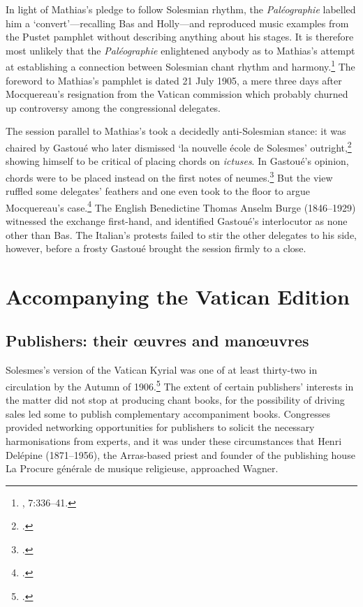 In light of Mathias's pledge to follow Solesmian rhythm, the \emph{Paléographie} labelled him a `convert'---recalling Bas and Holly---and reproduced music examples from the Pustet pamphlet without describing anything about his stages.
It is therefore most unlikely that the \emph{Paléographie} enlightened anybody as to Mathias's attempt at establishing a connection between Solesmian chant rhythm and harmony.\footnote{\cite{MocquereauPaleographiemusicale1901}, 7:336--41.}
The foreword to Mathias's pamphlet is dated 21 July 1905, a mere three days after Mocquereau's resignation from the Vatican commission which probably churned up controversy among the congressional delegates.

The session parallel to Mathias's took a decidedly anti-Solesmian stance: it was chaired by Gastoué who later dismissed `la nouvelle école de Solesmes' outright,\footcite[For a discussion of Gastoué's criticism of placing chords according to Solesmes rhythm, see][364--5]{Lessmannanachronismemusicalaccompagnement2019} showing himself to be critical of placing chords on \emph{ictuses}.
In Gastoué's opinion, chords were to be placed instead on the first notes of neumes.\footcite[35--6]{VilletardCongresinternationalchant1905}
But the view ruffled some delegates' feathers and one even took to the floor to argue Mocquereau's case.\footcite[167--8]{BrenetCongresinternationalchant1905}
The English Benedictine Thomas Anselm Burge (1846--1929) witnessed the exchange first-hand, and identified Gastoué's interlocutor as none other than Bas.
The Italian's protests failed to stir the other delegates to his side, however, before a frosty Gastoué brought the session firmly to a close.

\section{Accompanying the Vatican Edition}
\subsection{Publishers: their œuvres and manœuvres}
Solesmes's version of the Vatican Kyrial was one of at least thirty-two in circulation by the Autumn of 1906.\footcite[The numerals adjacent to Kyrials in the \emph{Revue du chant grégorien} serve as a sort of index of the published versions. See][p.~29 and \emph{passim}]{Bibliographiegregorienneeditions1906b}
The extent of certain publishers' interests in the matter did not stop at producing chant books, for the possibility of driving sales led some to publish complementary accompaniment books.
Congresses provided networking opportunities for publishers to solicit the necessary harmonisations from experts, and it was under these circumstances that Henri Delépine (1871--1956), the Arras-based priest and founder of the publishing house La Procure générale de musique religieuse, approached Wagner.

